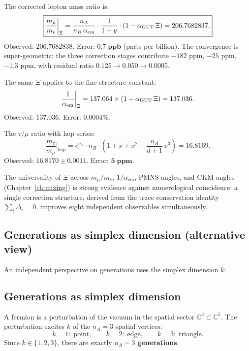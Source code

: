 The corrected lepton mass ratio is:
\begin{equation}
\boxed{\frac{m_\mu}{m_e}\bigg|_{\Xi} = \frac{n_A}{n_B\,\alpha_\mathrm{em}} \cdot \frac{1}{1 - y} \cdot (1 - \alpha_{\mathrm{GUT}}\,\Xi) = 206.7682837.}
\end{equation}
Observed: $206.7682838$.  Error: $\mathbf{0.7\;\text{ppb}}$ (parts per billion).  The convergence is super-geometric: the three correction stages contribute $-182$ ppm, $-25$ ppm, $-1.3$ ppm, with residual ratio $0.125 \to 0.050 \to 0.0005$.

The same $\Xi$ applies to the fine structure constant:
\begin{equation}
\frac{1}{\alpha_\mathrm{em}}\bigg|_{\Xi} = 137.064 \times (1 - \alpha_{\mathrm{GUT}}\,\Xi) = 137.036.
\end{equation}
Observed: $137.036$.  Error: $\mathbf{0.0004\%}$.

The $\tau/\mu$ ratio with hop series:
\begin{equation}
\frac{m_\tau}{m_\mu}\bigg|_{\text{hop}} = c^{n_A}\cdot n_B \cdot \left(1 + x + x^2 + \frac{n_A}{d+1}\,x^3\right) = 16.8169.
\end{equation}
Observed: $16.8170 \pm 0.0011$.  Error: $\mathbf{5\;\text{ppm}}$.

\begin{remark}
The universality of $\Xi$ across $m_\mu/m_e$, $1/\alpha_\mathrm{em}$, PMNS angles, and CKM angles (Chapter~\ref{ch:mixing}) is strong evidence against numerological coincidence: a single correction structure, derived from the trace conservation identity $\sum_i \Delta_i = 0$, improves eight independent observables simultaneously.
\end{remark}

\subsection{Generations as simplex dimension (alternative view)}
\label{sec:gen_alt}

An independent perspective on generations uses the simplex dimension $k$:

\subsection{Generations as simplex dimension}

A fermion is a perturbation of the vacuum in the spatial sector $\mathbb{C}^3 \subset \mathbb{C}^5$. The perturbation excites $k$ of the $n_A = 3$ spatial vertices:
\begin{equation}
k = 1:\;\text{point}, \qquad k = 2:\;\text{edge}, \qquad k = 3:\;\text{triangle}.
\end{equation}
Since $k \in \{1, 2, 3\}$, there are exactly $n_A = 3$ \textbf{generations}.

